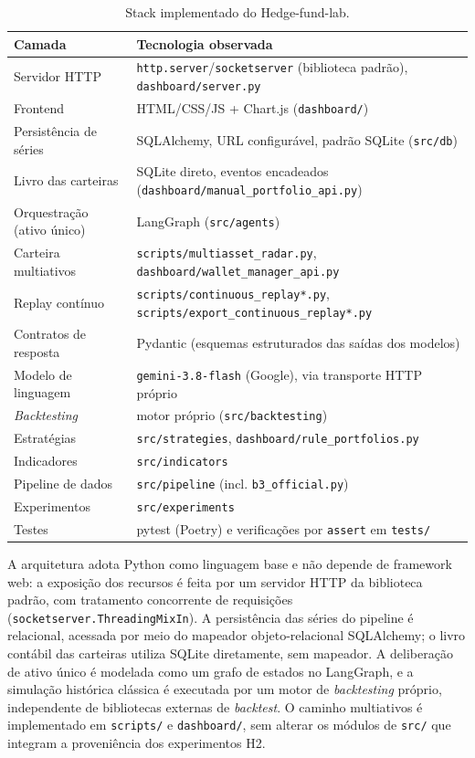 \begin{table}[!ht]
\centering
\caption{Stack implementado do Hedge-fund-lab.}
\label{tab:stack}
\small
\begin{tabular}{>{\raggedright\arraybackslash}p{3.8cm} >{\raggedright\arraybackslash}p{11.4cm}}
\toprule
\textbf{Camada} & \textbf{Tecnologia observada} \\
\midrule
Servidor HTTP & \texttt{http.server}/\texttt{socketserver} (biblioteca padrão), \texttt{dashboard/server.py} \\
Frontend & HTML/CSS/JS + Chart.js (\texttt{dashboard/}) \\
Persistência de séries & SQLAlchemy, URL configurável, padrão SQLite (\texttt{src/db}) \\
Livro das carteiras & SQLite direto, eventos encadeados (\texttt{dashboard/manual\_portfolio\_api.py}) \\
Orquestração (ativo único) & LangGraph (\texttt{src/agents}) \\
Carteira multiativos & \texttt{scripts/multiasset\_radar.py}, \texttt{dashboard/wallet\_manager\_api.py} \\
Replay contínuo & \texttt{scripts/continuous\_replay*.py}, \texttt{scripts/export\_continuous\_replay*.py} \\
Contratos de resposta & Pydantic (esquemas estruturados das saídas dos modelos) \\
Modelo de linguagem & \texttt{gemini-3.8-flash} (Google), via transporte HTTP próprio \\
\textit{Backtesting} & motor próprio (\texttt{src/backtesting}) \\
Estratégias & \texttt{src/strategies}, \texttt{dashboard/rule\_portfolios.py} \\
Indicadores & \texttt{src/indicators} \\
Pipeline de dados & \texttt{src/pipeline} (incl. \texttt{b3\_official.py}) \\
Experimentos & \texttt{src/experiments} \\
Testes & pytest (Poetry) e verificações por \texttt{assert} em \texttt{tests/} \\
\bottomrule
\end{tabular}
\end{table}

A arquitetura adota Python como linguagem base e não depende de framework web: a exposição dos recursos é feita por um servidor HTTP da biblioteca padrão, com tratamento concorrente de requisições (\texttt{socketserver.ThreadingMixIn}). A persistência das séries do pipeline é relacional, acessada por meio do mapeador objeto-relacional SQLAlchemy; o livro contábil das carteiras utiliza SQLite diretamente, sem mapeador. A deliberação de ativo único é modelada como um grafo de estados no LangGraph, e a simulação histórica clássica é executada por um motor de \textit{backtesting} próprio, independente de bibliotecas externas de \textit{backtest}. O caminho multiativos é implementado em \texttt{scripts/} e \texttt{dashboard/}, sem alterar os módulos de \texttt{src/} que integram a proveniência dos experimentos H2.

